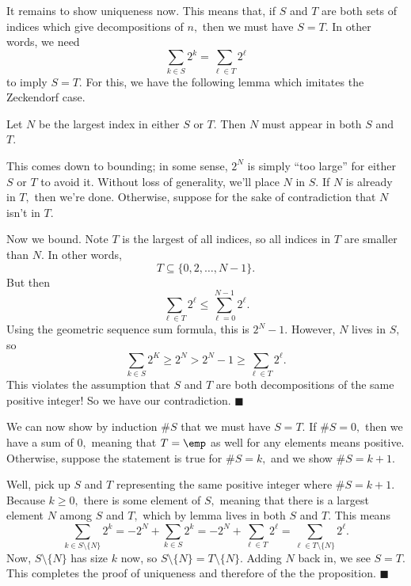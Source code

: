 It remains to show uniqueness now. This means that, if $S$ and $T$ are both sets of indices which give decompositions of $n,$ then we must have $S=T.$ In other words, we need
\[\sum_{k\in S}2^k=\sum_{\ell\in T}2^\ell\]
to imply $S=T.$ For this, we have the following lemma which imitates the Zeckendorf case.
\begin{lemma}
    Let $N$ be the largest index in either $S$ or $T.$ Then $N$ must appear in both $S$ and $T.$
\end{lemma}
This comes down to bounding; in some sense, $2^N$ is simply ``too large'' for either $S$ or $T$ to avoid it. Without loss of generality, we'll place $N$ in $S.$ If $N$ is already in $T,$ then we're done. Otherwise, suppose for the sake of contradiction that $N$ isn't in $T.$

Now we bound. Note $T$ is the largest of all indices, so all indices in $T$ are smaller than $N.$ In other words,
\[T\subseteq\{0,2,\ldots,N-1\}.\]
But then
\[\sum_{\ell\in T}2^\ell\le\sum_{\ell=0}^{N-1}2^\ell.\]
Using the geometric sequence sum formula, this is $2^N-1.$ However, $N$ lives in $S,$ so
\[\sum_{k\in S}2^K\ge 2^N>2^N-1\ge\sum_{\ell\in T}2^\ell.\]
This violates the assumption that $S$ and $T$ are both decompositions of the same positive integer! So we have our contradiction. $\blacksquare$

We can now show by induction $\#S$ that we must have $S=T.$ If $\#S=0,$ then we have a sum of $0,$ meaning that $T=\emp$ as well for any elements means positive. Otherwise, suppose the statement is true for $\#S=k,$ and we show $\#S=k+1.$

Well, pick up $S$ and $T$ representing the same positive integer where $\#S=k+1.$ Because $k\ge0,$ there is some element of $S,$ meaning that there is a largest element $N$ among $S$ and $T,$ which by lemma lives in both $S$ and $T.$ This means
\[\sum_{k\in S\setminus\{N\}}2^k=-2^N+\sum_{k\in S}2^k=-2^N+\sum_{\ell\in T}2^\ell=\sum_{\ell\in T\setminus\{N\}}2^\ell.\]
Now, $S\setminus\{N\}$ has size $k$ now, so $S\setminus\{N\}=T\setminus\{N\}.$ Adding $N$ back in, we see $S=T.$ This completes the proof of uniqueness and therefore of the the proposition. $\blacksquare$

